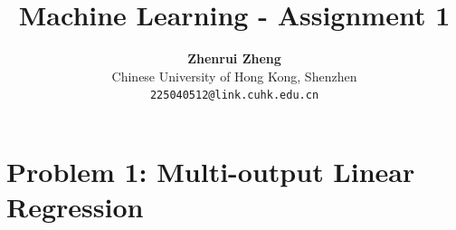 \documentclass[11pt, a4paper, oneside]{memoir}
\title{\huge\textbf{Machine Learning - Assignment 1}\vspace{-0.5cm}}
\author{\textbf{Zhenrui Zheng} \vspace{0.5cm} \\ \small Chinese University of Hong Kong, Shenzhen \\ \small\texttt{225040512@link.cuhk.edu.cn}}
\date{}
\begin{document}
\begin{titlingpage}
    \maketitle
    \renewcommand{\contentsname}{\huge Contents \vspace{-1cm}}
    \begin{KeepFromToc} %
        \tableofcontents
    \end{KeepFromToc}
\end{titlingpage}

\chapter{Problem 1: Multi-output Linear Regression}
\end{document}
